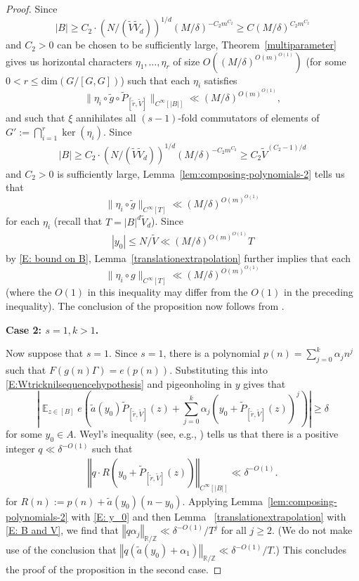 \documentclass[11pt]{amsart}
\theoremstyle{definition}
\DeclareMathOperator*{\E}{\mathbb{E}}
\newcommand{\norm}[1]{\left\Vert #1\right\Vert}
\newcommand{\abs}[1]{\mathopen{}\left| #1\mathclose{}\right|}
\begin{document}
\begin{proof}
Since
\[
|B| \geq C_2\cdot(N/(\tilde{V}\tilde{V}_d))^{1/d}(M/\delta)^{-C_2m^{C_2}} \geq C(M/\delta)^{C_2 m^{C_2}}
\]
and $C_2>0$ can be chosen to be sufficiently large, Theorem~\ref{multiparameter} gives us horizontal characters $\eta_1, \ldots, \eta_r$ of size $O((M/\delta)^{O(m)^{O(1)}})$ (for some $0<r\leq\mathrm{dim}(G/[G,G])$) such that each $\eta_i$ satisfies
\begin{equation}\label{eq:horizontalcharacterapplication}
    \|\eta_i \circ \tilde{g}\circ \widetilde{P}_{[\tilde{r}, \tilde{V}]}\|_{C^\infty[|B|]} \ll (M/\delta)^{O(m)^{O(1)}},    
\end{equation}
and such that $\xi$ annihilates all $(s-1)$-fold commutators of elements of $G':= \bigcap_{i=1}^r\ker(\eta_i)$.
Since
\begin{align}\label{E: B and V}
    |B| \geq C_2\cdot(N/(\tilde{V}\tilde{V}_d))^{1/d}(M/\delta)^{-C_2 m^{C_2}} \geq C_2\tilde{V}^{(C_2-1)/d}    
\end{align}
and $C_2>0$ is sufficiently large, Lemma~\ref{lem:composing-polynomials-2} tells us that
$$\|\eta_i \circ \tilde{g}\|_{C^\infty[T]} \ll (M/\delta)^{O(m)^{O(1)}}$$
for each $\eta_i$ (recall that $T=|B|^d\tilde{V}_d$).  Since
\begin{align}\label{E: y_0}
    |y_0|\leq N/\tilde{V}\ll (M/\delta)^{O(m)^{O(1)}} T   
\end{align}
by
\eqref{E: bound on B},  Lemma~\ref{translationextrapolation} further implies that each
$$\|\eta_i \circ g\|_{C^\infty[T]} \ll (M/\delta)^{O(m)^{O(1)}}$$
(where the $O(1)$ in this inequality may differ from the $O(1)$ in the preceding inequality).  The conclusion of the proposition now follows from \cite[Lemma A.1]{Leng23b}.

\smallskip
{\textbf{Case 2: $s=1, k>1$.}}
\smallskip

Now suppose that $s=1$.  Since $s=1$, there is a polynomial $p(n)=\sum_{j=0}^k \alpha_j n^j$ such that $F(g(n)\Gamma)=e(p(n))$.  Substituting this into \eqref{E:Wtricknilsequencehypothesis} and pigeonholing in $y$ gives that
    $$\abs{\E_{z \in [B]} e\left(\tilde{a}(y_0)\widetilde{P}_{[\tilde{r}, \tilde{V}]}(z) + \sum_{j = 0}^k \alpha_j (y_0 + \widetilde{P}_{[\tilde{r}, \tilde{V}]}(z))^{j}\right)} \ge \delta$$
for some $y_0 \in A$.  Weyl's inequality (see, e.g., \cite[Lemma 4.4]{GT12}) tells us that there is a positive integer $q\ll \delta^{-O(1)}$
such that
\begin{align*}
    \norm{q\cdot R(y_0 + \widetilde{P}_{[\tilde{r}, \tilde{V}]}(z))}_{C^\infty[|B|]}\ll \delta^{-O(1)}.
\end{align*}
for $R(n):= p(n) + \tilde{a}(y_0)(n-y_0)$.
Applying Lemma~\ref{lem:composing-polynomials-2} with \eqref{E: y_0} and then Lemma ~\ref{translationextrapolation} with \eqref{E: B and V}, we find that 
$\norm{q\alpha_j}_{\mathbb{R}/\mathbb{Z}} \ll \delta^{-O(1)}/T^j$ for all $j \geq 2$.
(We do not make use of the conclusion that $\norm{q(\tilde{a}(y_0)+\alpha_1)}_{\mathbb{R}/\mathbb{Z}} \ll \delta^{-O(1)}/T$.)  This concludes the proof of the proposition in the second case.



\end{proof}
\end{document}
